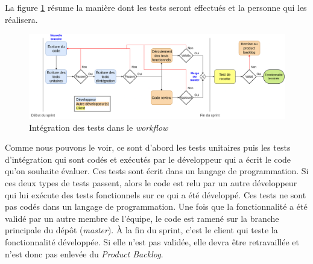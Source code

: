 \documentclass{article}
\begin{document}
La figure \ref{fig:workflow-tests} résume la manière dont les tests seront effectués et la personne qui les réalisera.

\begin{figure}[!ht]
    \centering
    \includegraphics[width=15cm]{Dev-Workflow-PFA.drawio.png}
    \caption{Intégration des tests dans le \textit{workflow}}
    \label{fig:workflow-tests}
\end{figure}

Comme nous pouvons le voir, ce sont d'abord les tests unitaires puis les tests d'intégration qui sont codés
et exécutés par le développeur qui a écrit le code qu'on souhaite évaluer. Ces tests sont écrit dans un langage de programmation.
Si ces deux types de tests passent, alors le code est relu par un autre développeur qui lui exécute des tests fonctionnels sur ce qui a été développé.
Ces tests ne sont pas codés dans un langage de programmation. Une fois que la fonctionnalité a été validé par un autre membre de l'équipe,
le code est ramené sur la branche principale du dépôt (\textit{master}). À la fin du sprint, c'est le client qui teste la fonctionnalité développée. Si elle n'est pas 
validée, elle devra être retravaillée et n'est donc pas enlevée du \textit{Product Backlog}.
\end{document}
